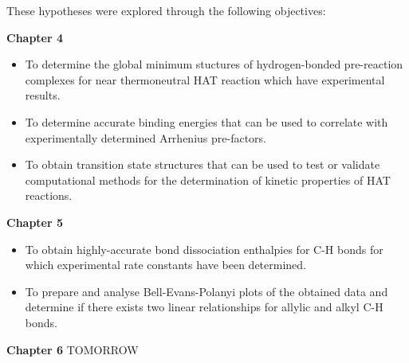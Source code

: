 These hypotheses were explored through the following objectives:

\textbf{Chapter 4}
\begin{itemize}
\item To determine the global minimum stuctures of hydrogen-bonded pre-reaction
  complexes for near thermoneutral HAT reaction which have experimental results.

\item To determine accurate binding energies that can be used to correlate with
  experimentally determined Arrhenius pre-factors.

\item To obtain transition state structures that can be used to test or validate
  computational methods for the determination of kinetic properties of HAT
  reactions.
\end{itemize}

\textbf{Chapter 5}
\begin{itemize}
\item To obtain highly-accurate bond dissociation enthalpies for C-H bonds for
  which experimental rate constants have been determined.

\item To prepare and analyse Bell-Evans-Polanyi plots of the obtained data and
  determine if there exists two linear relationships for allylic and alkyl C-H
  bonds.
\end{itemize}

\textbf{Chapter 6}
TOMORROW
